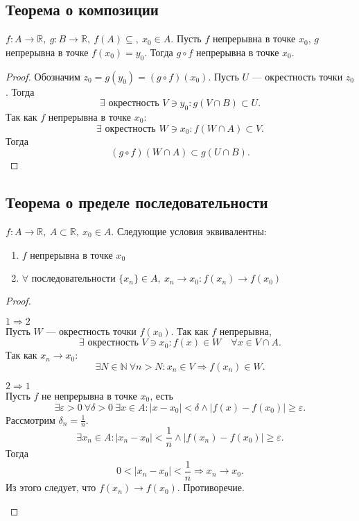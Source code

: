 \documentclass[11pt]{book}
\newcommand{\N}{\mathbb{N}}
\newcommand{\R}{\mathbb{R}}
\renewcommand{\ge}{\geqslant}
\theoremstyle{definition}
\theoremstyle{plain}
\theoremstyle{plain}
\theoremstyle{definition}
\theoremstyle{remark}
\begin{document}
\subsection{Теорема о композиции}
\begin{thm}[о композиции]
    $ f: A \to  \R, ~ g: B \to  \R, ~ f(A) \subseteq, ~ x_0 \in A$. Пусть $ f$ непрерывна в точке $ x_0$, $ g$ непрерывна в точке  $ f(x_0) = y_0$.
    Тогда $ g\circ f$ непрерывна в точке $ x_0$.
\end{thm}
\begin{proof}
    Обозначим $ z_0 = g(y_0) = (g \circ f)(x_0)$.
    Пусть $ U$ --- окрестность точки $ z_0$. Тогда
    \[
	\exists \text{ окрестность }   V \ni y_0: g(V \cap B) \subset U
    .\]
    Так как $ f$ непрерывна в точке  $ x_0$:
    \[
	\exists  \text{ окрестность }  W \ni x_0: f(W \cap A) \subset  V
    .\]
    Тогда \[
	(g \circ f)(W \cap A) \subset g(U \cap B)
    .\]
\end{proof}
\subsection{Теорема о пределе последовательности}
\begin{thm}
    $ f: A \to \R, ~ A\subset \R, ~ x_0 \in A$.
    Следующие условия эквивалентны:
    \begin{enumerate}
	\item $ f$ непрерывна в точке  $ x_0$
	\item $ \forall \text{ последовательности }\{x_{n}\} \in A, ~ x_{n} \to  x_0: f(x_{n}) \to  f(x_0)$
    \end{enumerate}
\end{thm}
\begin{proof}
    $ $
    \begin{description}
	\item $ \boxed{1 \Longrightarrow 2}$ \\
	    Пусть  $ W$ --- окрестность точки  $ f(x_0)$.  Так как $ f$ непрерывна,
	    \[
		\exists \text{ окрестность } V \ni  x_0: f(x) \in W \quad \forall x \in V \cap A
	    .\]
	    Так как $x_{n} \to  x_0$:
	    \[
		\exists N \in \N ~ \forall n > N: x_{n} \in V \Longrightarrow f(x_{n}) \in W
	    .\]
	\item $ \boxed{2 \Longrightarrow 1}$ \\
	    Пусть $ f$ не непрерывна в точке  $ x_0$, есть
	    \[
		\exists  \varepsilon >0 ~ \forall \delta >0~ \exists x \in A: |x - x_0| < \delta \wedge |f(x) - f(x_0)| \ge \varepsilon
	    .\]
	    Рассмотрим $ \delta_n = \frac{1}{n}$.
	    \[
		\exists x_{n} \in A: |x_{n}-x_0|<\frac{1}{n} \wedge |f(x_{n}) - f(x_0)  |\ge \varepsilon
	    .\]
	    Тогда  \[
		0 < |x_{n}-x_0| < \frac{1}{n} \Longrightarrow  x_{n} \to  x_0
	    .\]
	    Из этого следует, что $ f(x_{n}) \to  f(x_0)$. Противоречие.
    \end{description}
\end{proof}
\end{document}
